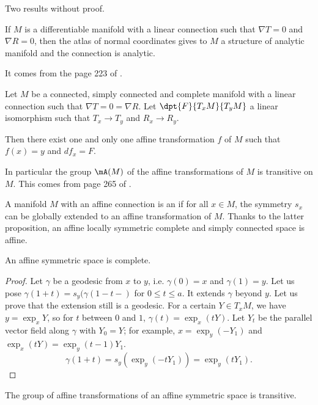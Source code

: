 Two results without proof.

\begin{theorem}
If $M$ is a differentiable manifold with a linear connection such that $\nabla T=0$ and $\nabla R=0$, then the atlas of normal coordinates gives to $M$ a structure of analytic manifold and the connection is analytic.
\end{theorem}
It comes from the page 223 of \cite{kobayashi}.

\begin{proposition}
Let $M$ be a connected, simply connected and complete manifold with a linear connection such that $\nabla T=0=\nabla R$. Let $\dpt{F}{T_xM}{T_yM}$ a linear isomorphism such that $T_x\to T_y$ and $R_x\to R_y$.

Then there exist one and only one affine transformation $f$ of $M$ such that $f(x)=y$ and $df_x=F$.
\end{proposition}
In particular the group $\mA(M)$ of the affine transformations of $M$ is transitive on $M$. This comes from page 265 of \cite{kobayashi}.

A manifold $M$ with an affine connection is an  if for all $x\in M$, the symmetry $s_x$ can be globally extended to an affine transformation of $M$. Thanks to the latter proposition, an affine locally symmetric complete and simply connected space is affine.


\begin{proposition}
An affine symmetric space is complete.
\end{proposition}

\begin{proof}
Let $\gamma$ be a geodesic from $x$ to $y$, i.e. $\gamma(0)=x$ and $\gamma(1)=y$. Let us pose $\gamma(1+t)=s_y(\gamma(1-t-)$ for $0\leq t\leq a$. It extends $\gamma$ beyond $y$. Let us prove that the extension still is a geodesic. For a certain $Y\in T_xM$, we have $y=\exp_xY$, so for $t$ between $0$ and $1$, $\gamma(t)=\exp_x(tY)$. Let $Y_t$ be the parallel vector field along $\gamma$ with $Y_0=Y$; for example, $x=\exp_y(-Y_1)$ and $\exp_x(tY)=\exp_y(t-1)Y_1$.
\begin{equation}
   \gamma(1+t)=s_y(\exp_y(-tY_1))
              =\exp_y(tY_1).
\end{equation}
\end{proof}

\begin{proposition}
The group of affine transformations of an affine symmetric space is transitive.
\end{proposition}

